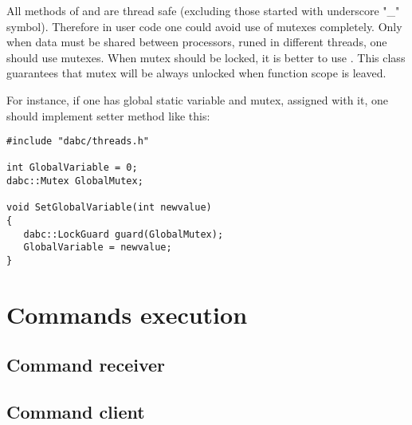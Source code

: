 All methods of  and  are thread
safe (excluding those started with underscore "\_" symbol). Therefore in
user code one could avoid use of mutexes completely. Only when data must be shared between
processors, runed in different threads, one should use mutexes. When mutex should be locked,
it is better to use . This class guarantees that mutex will be always unlocked
when function scope is leaved. 

For instance, if one has global static variable and mutex, assigned with it,
one should implement setter method like this:
\begin{small}
\begin{verbatim}
#include "dabc/threads.h"

int GlobalVariable = 0;
dabc::Mutex GlobalMutex;

void SetGlobalVariable(int newvalue) 
{
   dabc::LockGuard guard(GlobalMutex);
   GlobalVariable = newvalue;
}
\end{verbatim}     
\end{small}


\section{Commands execution}

\subsection{Command receiver}

\subsection{Command client}
